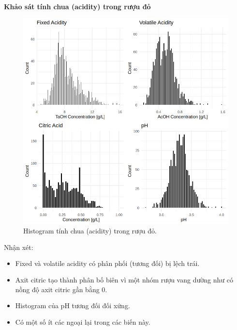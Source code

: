 \textbf{Khảo sát tính chua (acidity) trong rượu đỏ}
\begin{figure}[H]
    \centering
    \includegraphics[width=0.75\columnwidth]{wine_figures/red_acidity.png}
    \caption{Histogram tính chua (acidity) trong rượu đỏ.}
    \label{fig:red_acidity}
\end{figure}
Nhận xét:
\begin{itemize}
    \item Fixed và volatile acidity có phân phối (tương đối) bị lệch trái.
    \item Axit citric tạo thành phân bố biên vì một nhóm rượu vang dường như có nồng độ axit citric gần bằng 0.
    \item Histogram của pH tương đối đối xứng.
    \item Có một số ít các ngoại lại trong các biến này.
\end{itemize}

